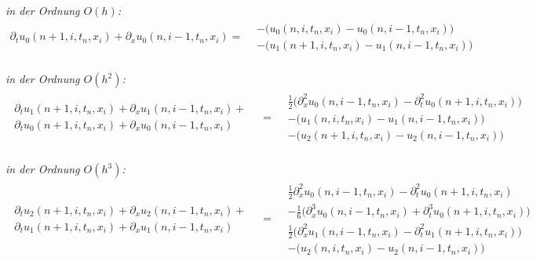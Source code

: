 \noindent \emph{in der Ordnung $O(h)$:}
\begin{align}\label{eq:transport:kleineta:oh}
\partial_t u_0(n+1, i, t_n, x_i) + \partial_x u_0(n, i-1, t_n, x_i) =
\begin{split}
&- \bigl( u_0(n, i, t_n, x_i) - u_0(n, i-1, t_n, x_i) \bigr)\\
&- \bigl( u_1(n+1, i, t_n, x_i) - u_1(n, i-1, t_n, x_i) \bigr)
\end{split}
\end{align}\\

\noindent \emph{in der Ordnung $O(h^2)$:}
{\small
\begin{align}\label{eq:transport:kleineta:oh2}
\begin{split}
\partial_t u_1(n+1, i, t_n, x_i) + \partial_x u_1(n, i-1, t_n, x_i) +\\
\partial_t u_0(n+1, i, t_n, x_i) + \partial_x u_0(n, i-1, t_n, x_i)
\end{split}
&=
\begin{split}
&\frac{1}{2} \bigl( \partial^2_x u_0(n, i-1, t_n, x_i) - \partial^2_t u_0(n+1,i, t_n, x_i)\bigr)\\
&- \bigl( u_1(n, i, t_n, x_i) - u_1(n, i-1, t_n, x_i) \bigr)\\
&- \bigl( u_2(n+1, i, t_n, x_i) - u_2(n, i-1, t_n, x_i) \bigr)
\end{split}
\end{align}
}\\

\noindent \emph{in der Ordnung $O(h^3)$:}
{\small
\begin{align}\label{eq:transport:kleineta:oh3}
\begin{split}
\partial_t u_2(n+1, i, t_n, x_i) + \partial_x u_2(n, i-1, t_n, x_i) +\\
\partial_t u_1(n+1, i, t_n, x_i) + \partial_x u_1(n, i-1, t_n, x_i)
\end{split}
&=
\begin{split}
&\frac{1}{2} \partial^2_x u_0(n, i-1, t_n, x_i) - \partial^2_t u_0(n+1,i, t_n, x_i)\\
&- \frac{1}{6}\bigl(\partial^3_x u_0(n, i-1, t_n, x_i) + \partial^3_t u_0(n+1,i, t_n, x_i) \bigr)\\
&\frac{1}{2} \bigl( \partial^2_x u_1(n, i-1, t_n, x_i) - \partial^2_t u_1(n+1,i, t_n, x_i) \bigr)\\
&- \bigl( u_2(n, i, t_n, x_i) - u_2(n, i-1, t_n, x_i) \bigr)
\end{split}
\end{align}\\
}

